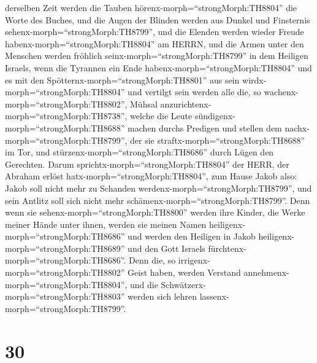 derselben Zeit werden die Tauben hörenx-morph=``strongMorph:TH8804'' die
Worte des Buches, und die Augen der Blinden werden aus Dunkel und
Finsternis sehenx-morph=``strongMorph:TH8799'',  und die
Elenden werden wieder Freude habenx-morph=``strongMorph:TH8804'' am
HERRN, und die Armen unter den Menschen werden fröhlich
seinx-morph=``strongMorph:TH8799'' in dem Heiligen Israels,
 wenn die Tyrannen ein Ende
habenx-morph=``strongMorph:TH8804'' und es mit den
Spötternx-morph=``strongMorph:TH8801'' aus sein
wirdx-morph=``strongMorph:TH8804'' und vertilgt sein werden alle die, so
wachenx-morph=``strongMorph:TH8802'', Mühsal
anzurichtenx-morph=``strongMorph:TH8738'',  welche die
Leute sündigenx-morph=``strongMorph:TH8688'' machen durchs Predigen und
stellen dem nachx-morph=``strongMorph:TH8799'', der sie
straftx-morph=``strongMorph:TH8688'' im Tor, und
stürzenx-morph=``strongMorph:TH8686'' durch Lügen den Gerechten.
 Darum sprichtx-morph=``strongMorph:TH8804'' der HERR, der
Abraham erlöst hatx-morph=``strongMorph:TH8804'', zum Hause Jakob also:
Jakob soll nicht mehr zu Schanden werdenx-morph=``strongMorph:TH8799'',
und sein Antlitz soll sich nicht mehr
schämenx-morph=``strongMorph:TH8799''.  Denn wenn sie
sehenx-morph=``strongMorph:TH8800'' werden ihre Kinder, die Werke meiner
Hände unter ihnen, werden sie meinen Namen
heiligenx-morph=``strongMorph:TH8686'' und werden den Heiligen in Jakob
heiligenx-morph=``strongMorph:TH8689'' und den Gott Israels
fürchtenx-morph=``strongMorph:TH8686''.  Denn die, so
irrigenx-morph=``strongMorph:TH8802'' Geist haben, werden Verstand
annehmenx-morph=``strongMorph:TH8804'', und die
Schwätzerx-morph=``strongMorph:TH8803'' werden sich lehren
lassenx-morph=``strongMorph:TH8799''.

\hypertarget{section-29}{%
\section{30}\label{section-29}}

